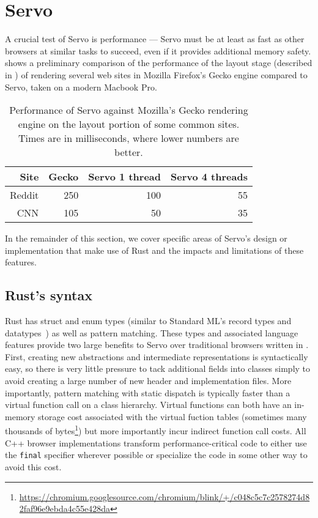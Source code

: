 \section{Servo}
\label{sec:servo}
A crucial test of Servo is performance --- Servo must be at least as fast
as other browsers at similar tasks to succeed, even if it provides additional memory safety.
 shows a preliminary comparison of the performance of the layout stage (described
in ) of rendering several web sites in Mozilla Firefox's Gecko engine compared
to Servo, taken on a modern Macbook Pro.
\begin{table}
  \begin{center}
    \begin{tabular}{r || r | r | r}
      Site & Gecko & Servo 1 thread & Servo 4 threads \\
      \hline
      Reddit & 250 & 100 & 55  \\
      CNN & 105 & 50 & 35 \\
    \end{tabular}%
  \end{center}%
  \caption{Performance of Servo against Mozilla's Gecko rendering engine on the layout portion of some common sites.
  Times are in milliseconds, where lower numbers are better.}
  \label{servo-perf}
\end{table}
In the remainder of this section, we cover specific areas of Servo's design or implementation that make use of
Rust and the impacts and limitations of these features.

\subsection{Rust's syntax}
Rust has struct and enum types (similar to Standard ML's record types and datatypes~\cite{sml97-definition}) as
well as pattern matching.
These types and associated language features provide two large benefits to Servo over traditional browsers
written in \Cplusplus{}.
First, creating new abstractions and intermediate representations is syntactically easy, so there is very little
pressure to tack additional fields into classes simply to avoid creating a large number of new header and implementation
files.
More importantly, pattern matching with static dispatch is typically faster than a virtual function call on a class
hierarchy.
Virtual functions can both have an in-memory storage cost associated with the virtual fuction tables (sometimes many thousands of bytes\footnote{\url{https://chromium.googlesource.com/chromium/blink/+/c048c5c7c2578274d82faf96e9ebda4c55e428da}}) but more importantly
incur indirect function call costs.
All C++ browser implementations transform performance-critical code to either use the \lstinline[language=C]{final}
specifier wherever possible or specialize the code in some other way to avoid this cost.


